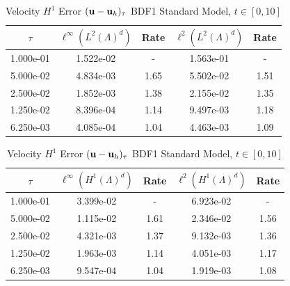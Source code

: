 \documentclass[letterpaper]{erdc}
\begin{document}
\begin{table}[h!]
  \parbox{.45\linewidth}{
  \tiny
  \centering
    \caption{Velocity $L^2$ Error $(\textbf{u} - \textbf{u}_h)_{\tau}$ BDF1 Standard Model, $t\in[0,10]$}
    \begin{tabular}{c|c|c|c|c}
      $\tau$ &  $\ell^{\infty}\left(L^2(\Lambda)^d\right)$ &  Rate  &  $\ell^2\left(L^2(\Lambda)^d\right)$  &  Rate\\
      \hline
      1.000e-01 & 1.522e-02 &  -   & 1.563e-01 &  -  \\
      5.000e-02 & 4.834e-03 & 1.65 & 5.502e-02 & 1.51\\
      2.500e-02 & 1.852e-03 & 1.38 & 2.155e-02 & 1.35\\
      1.250e-02 & 8.396e-04 & 1.14 & 9.497e-03 & 1.18\\
      6.250e-03 & 4.085e-04 & 1.04 & 4.463e-03 & 1.09
    \end{tabular}
    }
    \hfill
    \parbox{.45\linewidth}{
    \tiny
    \centering
      \caption{Velocity $H^1$ Error $(\textbf{u} - \textbf{u}_h)_{\tau}$ BDF1 Standard Model, $t\in[0,10]$}
      \begin{tabular}{c|c|c|c|c}
        $\tau$ &  $\ell^{\infty}\left(H^1(\Lambda)^d\right)$ &  Rate  &  $\ell^2\left(H^1(\Lambda)^d\right)$  &  Rate\\
        \hline
        1.000e-01 & 3.399e-02 &  -   & 6.923e-02 &  -  \\
        5.000e-02 & 1.115e-02 & 1.61 & 2.346e-02 & 1.56\\
        2.500e-02 & 4.321e-03 & 1.37 & 9.132e-03 & 1.36\\
        1.250e-02 & 1.963e-03 & 1.14 & 4.051e-03 & 1.17\\
        6.250e-03 & 9.547e-04 & 1.04 & 1.919e-03 & 1.08
      \end{tabular}
    }
\end{table}



%
%
\end{document}
